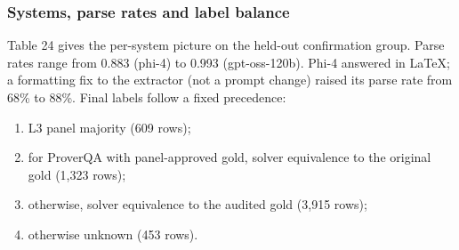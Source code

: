 \documentclass[11pt,letterpaper]{article}
\begin{document}
\subsubsection{Systems, parse rates and label balance}

Table 24 gives the per-system picture on the held-out confirmation group. Parse rates range from 0.883 (phi-4) to 0.993 (gpt-oss-120b). Phi-4 answered in LaTeX; a formatting fix to the extractor (not a prompt change) raised its parse rate from 68\% to 88\%. Final labels follow a fixed precedence:

\begin{enumerate}
\item {}L3 panel majority (609 rows);
\item {}for ProverQA with panel-approved gold, solver equivalence to the original gold (1,323 rows);
\item {}otherwise, solver equivalence to the audited gold (3,915 rows);
\item {}otherwise unknown (453 rows).
\end{enumerate}
\end{document}
